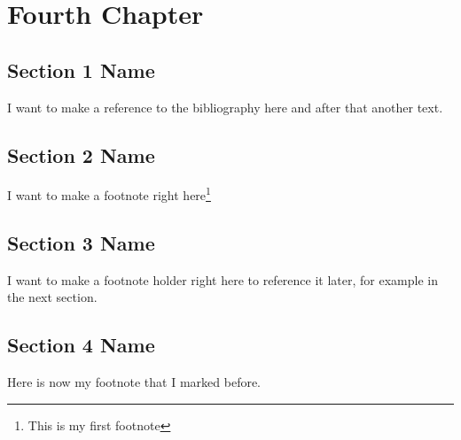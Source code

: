 \chapter{Fourth Chapter}

\section{Section 1 Name}
I want to make a reference to the bibliography here\cite{Abc} and after that another text.

\section{Section 2 Name}
I want to make a footnote right here\footnote{This is my first footnote}

\section{Section 3 Name}
I want to make a footnote holder right here to reference it later, for example in the next section.

\section{Section 4 Name}
Here\footnotemark{} is now my footnote that I marked before.